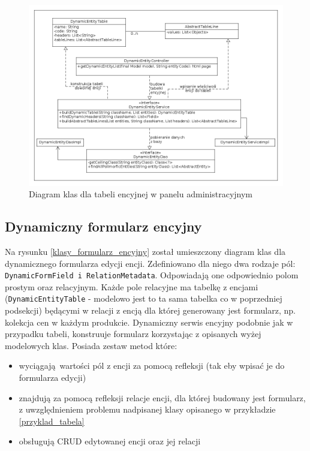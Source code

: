 \begin{figure}
	\begin{center}
		\includegraphics[scale=0.4]{klasy_tabela_encyjna.png}
	\end{center}
	\caption{{\color{black}Diagram klas dla tabeli encyjnej w panelu administracyjnym}} \label{klasy_tabela_encyjna}
\end{figure}

\subsection{Dynamiczny formularz encyjny}
Na rysunku \ref{klasy_formularz_encyjny} został umieszczony diagram klas dla dynamicznego formularza edycji encji. Zdefiniowano dla niego dwa rodzaje pól: \texttt{DynamicFormField i RelationMetadata}. Odpowiadają one odpowiednio polom prostym oraz relacyjnym. Każde pole relacyjne ma tabelkę z encjami (\texttt{DynamicEntityTable} - modelowo jest to ta sama tabelka co w poprzedniej podsekcji) będącymi w relacji z encją dla której generowany jest formularz, np. kolekcja cen w każdym produkcie. Dynamiczny serwis encyjny podobnie jak w przypadku tabeli, konstruuje formularz korzystając z opisanych wyżej modelowych klas. Posiada zestaw metod które:
\begin{itemize}
	\item wyciągają wartości pól z encji za pomocą refleksji (tak eby wpisać je do formularza edycji)
	\item znajdują za pomocą refleksji relacje encji, dla której budowany jest formularz, z uwzględnieniem problemu nadpisanej klasy opisanego w przykładzie \ref{przyklad_tabela}
	\item obsługują CRUD edytowanej encji oraz jej relacji 
\end{itemize}  

